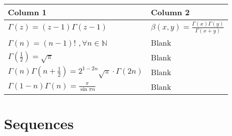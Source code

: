 \documentclass[
]{article}
\begin{document}
\begin{longtable}[]{@{}ll@{}}
\toprule
\begin{minipage}[b]{0.53\columnwidth}\raggedright
Column 1\strut
\end{minipage} & \begin{minipage}[b]{0.41\columnwidth}\raggedright
Column 2\strut
\end{minipage}\tabularnewline
\midrule
\endhead
\begin{minipage}[t]{0.53\columnwidth}\raggedright
\(\Gamma(z) = (z-1)\Gamma(z-1)\)\strut
\end{minipage} & \begin{minipage}[t]{0.41\columnwidth}\raggedright
\(\beta(x,y)= \frac{\Gamma(x)\Gamma(y)}{\Gamma(x+y)}\)\strut
\end{minipage}\tabularnewline
\begin{minipage}[t]{0.53\columnwidth}\raggedright
\(\Gamma(n) = (n-1)!\) \(,\forall n\in \mathbb{N}\)\strut
\end{minipage} & \begin{minipage}[t]{0.41\columnwidth}\raggedright
Blank\strut
\end{minipage}\tabularnewline
\begin{minipage}[t]{0.53\columnwidth}\raggedright
\(\Gamma(\frac{1}{2}) = \sqrt{\pi}\)\strut
\end{minipage} & \begin{minipage}[t]{0.41\columnwidth}\raggedright
Blank\strut
\end{minipage}\tabularnewline
\begin{minipage}[t]{0.53\columnwidth}\raggedright
\(\Gamma(n)\Gamma(n+\frac{1}{2}) = 2^{1-2n}\sqrt{\pi}\cdot\Gamma(2n)\)\strut
\end{minipage} & \begin{minipage}[t]{0.41\columnwidth}\raggedright
Blank\strut
\end{minipage}\tabularnewline
\begin{minipage}[t]{0.53\columnwidth}\raggedright
\(\Gamma(1-n)\Gamma(n)= \frac{\pi}{\sin{\pi n}}\)\strut
\end{minipage} & \begin{minipage}[t]{0.41\columnwidth}\raggedright
Blank\strut
\end{minipage}\tabularnewline
\bottomrule
\end{longtable}

\hypertarget{sequences}{%
\section{Sequences}\label{sequences}}
\end{document}
